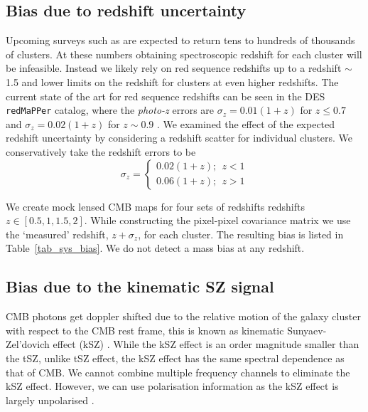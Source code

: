  \subsection{Bias due to redshift uncertainty}
Upcoming surveys such as \citep{benson14,so18, cmbs4-sb1} are expected to return tens to hundreds of thousands of clusters. 
 At these numbers obtaining spectroscopic redshift for each cluster will be infeasible.  
Instead we likely rely on red sequence redshifts up to a redshift $\sim$ 1.5 and lower limits on the redshift for clusters at even higher redshifts. 
The current state of the art for red sequence redshifts can be seen in the  DES \texttt{redMaPPer} catalog, where the \emph{photo-z} errors are $\sigma_{z} = 0.01 (1+z)$ for $z \le 0.7$ and $\sigma_{z} = 0.02 (1+z)$ for $z \sim 0.9$ \citep{rykoff16}. We examined the effect of the expected redshift uncertainty by considering a redshift scatter for individual clusters. We conservatively take the redshift errors to be
\begin{equation}\nonumber
\sigma_z = \left\{
\begin{array}{l}
    0.02 (1+z);  ~~z < 1 \\
    0.06 (1+z);  ~~z > 1
  \end{array}\right.
\end{equation}

We create mock lensed CMB maps for four sets of redshifts redshifts $z\in[0.5, 1, 1.5, 2]$. While constructing the pixel-pixel covariance matrix we use the `measured' redshift, $z + \sigma_{z}$, for each cluster.                                                                        
The resulting bias is listed in Table~\ref{tab_sys_bias}. We do not detect a mass bias at any redshift. 
 
\subsection{Bias due to the kinematic SZ signal}
CMB photons get doppler shifted due to the relative motion of the galaxy cluster with respect to the CMB rest frame, this is known as kinematic Sunyaev-Zel'dovich effect (kSZ) \citep{sunyaev72}.
While the kSZ effect is an order magnitude smaller than the tSZ, unlike tSZ effect, the kSZ effect has the same spectral dependence as that of CMB. 
We cannot combine multiple frequency channels to eliminate the kSZ effect. 
However, we can use polarisation information as the kSZ effect is largely unpolarised  \citep{sazonov99}.

